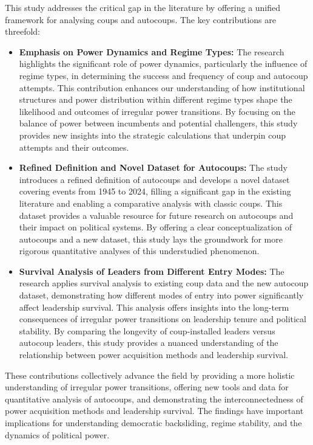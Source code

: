 \documentclass[
  12pt,
]{report}
\begin{document}
This study addresses the critical gap in the literature by offering a
unified framework for analysing coups and autocoups. The key
contributions are threefold:

\begin{itemize}
\item
  \textbf{Emphasis on Power Dynamics and Regime Types:} The research
  highlights the significant role of power dynamics, particularly the
  influence of regime types, in determining the success and frequency of
  coup and autocoup attempts. This contribution enhances our
  understanding of how institutional structures and power distribution
  within different regime types shape the likelihood and outcomes of
  irregular power transitions. By focusing on the balance of power
  between incumbents and potential challengers, this study provides new
  insights into the strategic calculations that underpin coup attempts
  and their outcomes.
\item
  \textbf{Refined Definition and Novel Dataset for Autocoups:} The study
  introduces a refined definition of autocoups and develops a novel
  dataset covering events from 1945 to 2024, filling a significant gap
  in the existing literature and enabling a comparative analysis with
  classic coups. This dataset provides a valuable resource for future
  research on autocoups and their impact on political systems. By
  offering a clear conceptualization of autocoups and a new dataset,
  this study lays the groundwork for more rigorous quantitative analyses
  of this understudied phenomenon.
\item
  \textbf{Survival Analysis of Leaders from Different Entry Modes:} The
  research applies survival analysis to existing coup data and the new
  autocoup dataset, demonstrating how different modes of entry into
  power significantly affect leadership survival. This analysis offers
  insights into the long-term consequences of irregular power
  transitions on leadership tenure and political stability. By comparing
  the longevity of coup-installed leaders versus autocoup leaders, this
  study provides a nuanced understanding of the relationship between
  power acquisition methods and leadership survival.
\end{itemize}

These contributions collectively advance the field by providing a more
holistic understanding of irregular power transitions, offering new
tools and data for quantitative analysis of autocoups, and demonstrating
the interconnectedness of power acquisition methods and leadership
survival. The findings have important implications for understanding
democratic backsliding, regime stability, and the dynamics of political
power.
\end{document}
